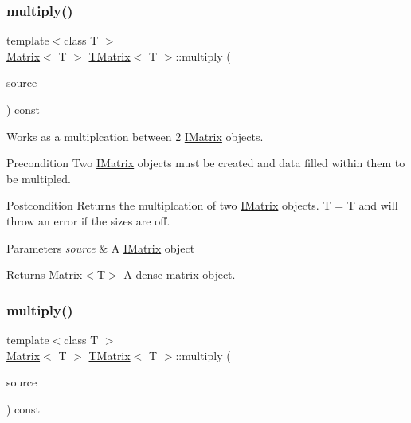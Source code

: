 \subsubsection{\texorpdfstring{multiply()}{multiply()}\hspace{0.1cm}{\footnotesize\ttfamily [3/6]}}
{\footnotesize\ttfamily template$<$class T $>$ \\
\mbox{\hyperlink{class_matrix}{Matrix}}$<$ T $>$ \mbox{\hyperlink{class_t_matrix}{T\+Matrix}}$<$ T $>$\+::multiply (\begin{DoxyParamCaption}\item[{const \mbox{\hyperlink{class_i_matrix}{I\+Matrix}}$<$ \mbox{\hyperlink{class_l_matrix}{L\+Matrix}}$<$ T $>$, T $>$ \&}]{source }\end{DoxyParamCaption}) const}



Works as a multiplcation between 2 \mbox{\hyperlink{class_i_matrix}{I\+Matrix}} objects. 

\begin{DoxyPrecond}{Precondition}
Two \mbox{\hyperlink{class_i_matrix}{I\+Matrix}} objects must be created and data filled within them to be multipled. 
\end{DoxyPrecond}
\begin{DoxyPostcond}{Postcondition}
Returns the multiplcation of two \mbox{\hyperlink{class_i_matrix}{I\+Matrix}} objects. T = T and will throw an error if the sizes are off.
\end{DoxyPostcond}

\begin{DoxyParams}{Parameters}
{\em source} & A \mbox{\hyperlink{class_i_matrix}{I\+Matrix}} object \\
\hline
\end{DoxyParams}
\begin{DoxyReturn}{Returns}
Matrix$<$\+T$>$ A dense matrix object. 
\end{DoxyReturn}
\mbox{\label{class_t_matrix_a7c45285ff66e2438d39821a48a03b5b7}} 
\subsubsection{\texorpdfstring{multiply()}{multiply()}\hspace{0.1cm}{\footnotesize\ttfamily [4/6]}}
{\footnotesize\ttfamily template$<$class T $>$ \\
\mbox{\hyperlink{class_matrix}{Matrix}}$<$ T $>$ \mbox{\hyperlink{class_t_matrix}{T\+Matrix}}$<$ T $>$\+::multiply (\begin{DoxyParamCaption}\item[{const \mbox{\hyperlink{class_i_matrix}{I\+Matrix}}$<$ \mbox{\hyperlink{class_u_matrix}{U\+Matrix}}$<$ T $>$, T $>$ \&}]{source }\end{DoxyParamCaption}) const}



